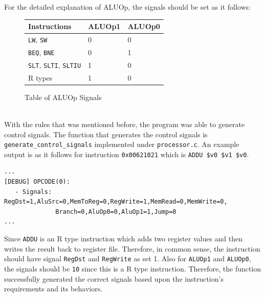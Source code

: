 \documentclass{homework}
\begin{document}
For the detailed explanation of ALUOp, the signals should be set as it follows:
\\
\begin{figure}[h]
\begin{center}
\begin{tabular}{|l|l|l|}
    \hline
        \textbf{Instructions} & \textbf{ALUOp1} & \textbf{ALUOp0} \\
    \hline
        \texttt{LW}, \texttt{SW} & 0 & 0 \\
        \texttt{BEQ}, \texttt{BNE} & 0 & 1 \\
        \texttt{SLT}, \texttt{SLTI}, \texttt{SLTIU} & 1 & 0 \\
        R types & 1 & 0 \\
    \hline
\end{tabular}
\caption{Table of ALUOp Signals}
\end{center}
\end{figure}
\\
With the rules that was mentioned before, the program was able to generate control signals. The function that generates the control signals is \texttt{generate_control_signals} implemented under \texttt{processor.c}. An example output is as it follows for instruction \texttt{0x00621021} which is \texttt{ADDU \$v0 \$v1 \$v0}. 
\\
\begin{center}
\begin{code}
\begin{verbatim}
...
[DEBUG] OPCODE(0):
   - Signals: RegDst=1,AluSrc=0,MemToReg=0,RegWrite=1,MemRead=0,MemWrite=0,
              Branch=0,AluOp0=0,AluOp1=1,Jump=0
...
\end{verbatim}
\end{code}
\end{center}
Since \texttt{ADDU} is an R type instruction which adds two register values and then writes the result back to register file. Therefore, in common sense, the instruction should have signal \texttt{RegDst} and \texttt{RegWrite} as set 1. Also for \texttt{ALUOp1} and \texttt{ALUOp0}, the signals should be \texttt{10} since this is a R type instruction. Therefore, the function successfully generated the correct signals based upon the instruction's requirements and its behaviors. 
\end{document}
